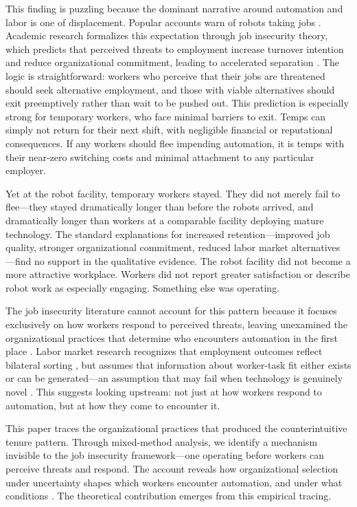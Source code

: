 \documentclass[12pt]{article}
\begin{document}
This finding is puzzling because the dominant narrative around automation and labor is one of displacement. Popular accounts warn of robots taking jobs \citep{frey2017future}. Academic research formalizes this expectation through job insecurity theory, which predicts that perceived threats to employment increase turnover intention and reduce organizational commitment, leading to accelerated separation \citep{sverke2002job, greenhalgh1984job}. The logic is straightforward: workers who perceive that their jobs are threatened should seek alternative employment, and those with viable alternatives should exit preemptively rather than wait to be pushed out. This prediction is especially strong for temporary workers, who face minimal barriers to exit. Temps can simply not return for their next shift, with negligible financial or reputational consequences. If any workers should flee impending automation, it is temps with their near-zero switching costs and minimal attachment to any particular employer.

Yet at the robot facility, temporary workers stayed. They did not merely fail to flee---they stayed dramatically longer than before the robots arrived, and dramatically longer than workers at a comparable facility deploying mature technology. The standard explanations for increased retention---improved job quality, stronger organizational commitment, reduced labor market alternatives \citep{mitchell2001turnover, griffeth2000meta}---find no support in the qualitative evidence. The robot facility did not become a more attractive workplace. Workers did not report greater satisfaction or describe robot work as especially engaging. Something else was operating.

The job insecurity literature cannot account for this pattern because it focuses exclusively on how workers respond to perceived threats, leaving unexamined the organizational practices that determine who encounters automation in the first place \citep{sverke2002job, greenhalgh1984job}. Labor market research recognizes that employment outcomes reflect bilateral sorting \citep{jovanovic1979job, autor2009studies}, but assumes that information about worker-task fit either exists or can be generated---an assumption that may fail when technology is genuinely novel \citep{barley1986technology, orr1996talking}. This suggests looking upstream: not just at how workers respond to automation, but at how they come to encounter it.

This paper traces the organizational practices that produced the counterintuitive tenure pattern. Through mixed-method analysis, we identify a mechanism invisible to the job insecurity framework---one operating before workers can perceive threats and respond. The account reveals how organizational selection under uncertainty shapes which workers encounter automation, and under what conditions \citep{orlikowski2000using}. The theoretical contribution emerges from this empirical tracing.
\end{document}
